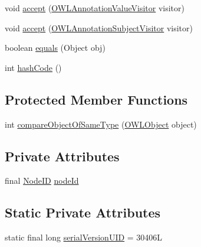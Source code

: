 \begin{DoxyCompactItemize}
\item 
void \hyperlink{classuk_1_1ac_1_1manchester_1_1cs_1_1owl_1_1owlapi_1_1_o_w_l_anonymous_individual_impl_a42256d0b697c78a88ce70621bacb8198}{accept} (\hyperlink{interfaceorg_1_1semanticweb_1_1owlapi_1_1model_1_1_o_w_l_annotation_value_visitor}{O\-W\-L\-Annotation\-Value\-Visitor} visitor)
\item 
void \hyperlink{classuk_1_1ac_1_1manchester_1_1cs_1_1owl_1_1owlapi_1_1_o_w_l_anonymous_individual_impl_ab64511fbd7c215affa242fffcc720aa5}{accept} (\hyperlink{interfaceorg_1_1semanticweb_1_1owlapi_1_1model_1_1_o_w_l_annotation_subject_visitor}{O\-W\-L\-Annotation\-Subject\-Visitor} visitor)
\item 
boolean \hyperlink{classuk_1_1ac_1_1manchester_1_1cs_1_1owl_1_1owlapi_1_1_o_w_l_anonymous_individual_impl_a9d9bda4fa6823c890468ec36f41bd5a4}{equals} (Object obj)
\item 
int \hyperlink{classuk_1_1ac_1_1manchester_1_1cs_1_1owl_1_1owlapi_1_1_o_w_l_anonymous_individual_impl_a097780752c84f4f254a21280ca79d208}{hash\-Code} ()
\end{DoxyCompactItemize}
\subsection*{Protected Member Functions}
\begin{DoxyCompactItemize}
\item 
int \hyperlink{classuk_1_1ac_1_1manchester_1_1cs_1_1owl_1_1owlapi_1_1_o_w_l_anonymous_individual_impl_aafa3781d03d26816cdb42eb0cb905428}{compare\-Object\-Of\-Same\-Type} (\hyperlink{interfaceorg_1_1semanticweb_1_1owlapi_1_1model_1_1_o_w_l_object}{O\-W\-L\-Object} object)
\end{DoxyCompactItemize}
\subsection*{Private Attributes}
\begin{DoxyCompactItemize}
\item 
final \hyperlink{classorg_1_1semanticweb_1_1owlapi_1_1model_1_1_node_i_d}{Node\-I\-D} \hyperlink{classuk_1_1ac_1_1manchester_1_1cs_1_1owl_1_1owlapi_1_1_o_w_l_anonymous_individual_impl_ab874be0f1fee5ffc94b123fc84de6154}{node\-Id}
\end{DoxyCompactItemize}
\subsection*{Static Private Attributes}
\begin{DoxyCompactItemize}
\item 
static final long \hyperlink{classuk_1_1ac_1_1manchester_1_1cs_1_1owl_1_1owlapi_1_1_o_w_l_anonymous_individual_impl_ab5a49ee41edafe48fd7b1cf7eed4e436}{serial\-Version\-U\-I\-D} = 30406\-L
\end{DoxyCompactItemize}
